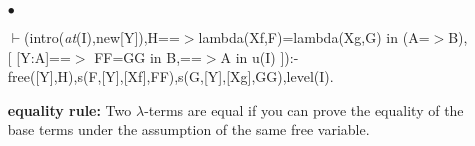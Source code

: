 \documentclass[11pt]{report}
\begin{document}
\begin{enumerate}
\begin{sf}\begin{tabbing}
$\vdash$(intro(\mbox{\it at}(I),using(AA=$>$BB),new[X,Y,W]),H==$>$F in (A=$>$B),\\[-0.15ex]
\hspace{2em}[ [X:A,Y:A,W:X=Y in A]==$>$F of X =F of Y in B, \\[-0.15ex]
\hspace{3em}==$>$A in u(I), \\[-0.15ex]
\hspace{3em}==$>$F in (AA=$>$BB) ]):-\\[-0.15ex]
\hspace{2em}free([X,Y,W],H),level(I).
\end{tabbing}\end{sf}

  
 \item[$\bullet$]
\begin{sf}\begin{tabbing}
$\vdash$(intro(\mbox{\it at}(I),new[Y]),H==$>$lambda(Xf,F)=lambda(Xg,G) in (A=$>$B),\\[-0.15ex]
\hspace{2em}[ [Y:A]==$>$ FF=GG in B,==$>$A in u(I) ]):-\\[-0.15ex]
\hspace{2em}free([Y],H),s(F,[Y],[Xf],FF),s(G,[Y],[Xg],GG),level(I).
\end{tabbing}\end{sf}

 {\bf equality rule:}
 Two $\lambda$-terms are equal if you can prove the equality
 of the base terms under the assumption of the same free variable.
 \end{enumerate}
  
\end{document}
